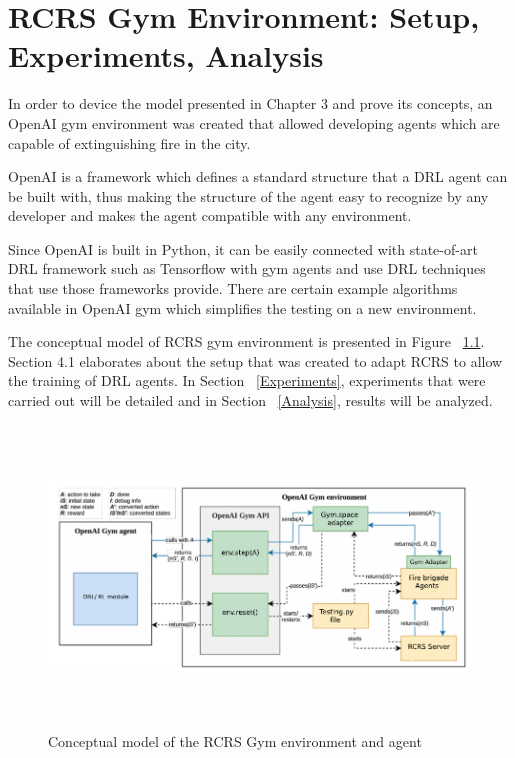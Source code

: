 \documentclass[12pt]{report}
\begin{document}
\chapter{RCRS Gym Environment: Setup, Experiments, Analysis}

In order to device the model presented in Chapter 3 and prove its concepts, an OpenAI gym environment \cite{brockman2016openai} was created that allowed developing agents which are capable of extinguishing fire in the city. 

OpenAI is a framework which defines a standard structure that a DRL agent can be built with, thus making the structure of the agent easy to recognize by any developer and makes the agent compatible with any environment. 

Since OpenAI is built in Python, it can be easily connected with state-of-art DRL framework such as Tensorflow \cite{Abadi} with gym agents and use DRL techniques that use those frameworks provide. There are certain example algorithms available in OpenAI gym which simplifies the testing on a new environment. 

The conceptual model of RCRS gym environment is presented in Figure ~\ref{fig:OpenAIgymRCRS}. Section 4.1 elaborates about the setup that was created to adapt RCRS to allow the training of DRL agents. In Section ~\ref{Experiments}, experiments that were carried out will be detailed and in Section ~\ref{Analysis}, results will be analyzed. 

\begin{figure}[!h]
    \centering
    \includegraphics[height=8cm, width=17cm]{OpenAIgymRCRS.png}
    \caption{Conceptual model of the RCRS Gym environment and agent}
    \label{fig:OpenAIgymRCRS}
\end{figure}
\end{document}
